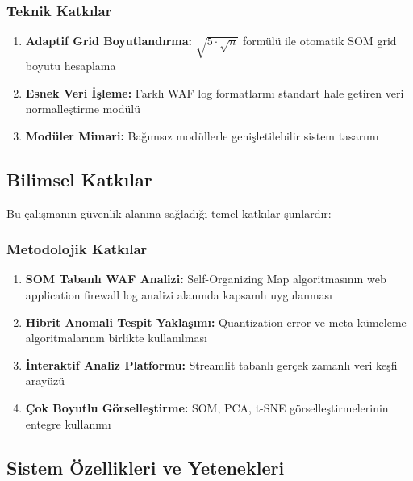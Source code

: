 \subsubsection{Teknik Katkılar}

\begin{enumerate}
    \item \textbf{Adaptif Grid Boyutlandırma:} $\sqrt{5 \cdot \sqrt{n}}$ formülü ile otomatik SOM grid boyutu hesaplama
    
    \item \textbf{Esnek Veri İşleme:} Farklı WAF log formatlarını standart hale getiren veri normalleştirme modülü
    
    \item \textbf{Modüler Mimari:} Bağımsız modüllerle genişletilebilir sistem tasarımı
\end{enumerate}

\newpage

\subsection{Bilimsel Katkılar}

Bu çalışmanın güvenlik alanına sağladığı temel katkılar şunlardır:

\subsubsection{Metodolojik Katkılar}

\begin{enumerate}
    \item \textbf{SOM Tabanlı WAF Analizi:} Self-Organizing Map algoritmasının web application firewall log analizi alanında kapsamlı uygulanması
    
    \item \textbf{Hibrit Anomali Tespit Yaklaşımı:} Quantization error ve meta-kümeleme algoritmalarının birlikte kullanılması
    
    \item \textbf{İnteraktif Analiz Platformu:} Streamlit tabanlı gerçek zamanlı veri keşfi arayüzü
    
    \item \textbf{Çok Boyutlu Görselleştirme:} SOM, PCA, t-SNE görselleştirmelerinin entegre kullanımı
\end{enumerate}

\subsection{Sistem Özellikleri ve Yetenekleri}

